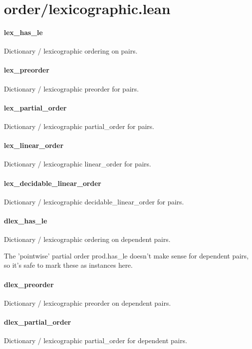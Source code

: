 \documentclass{article}
\begin{document}
\section{order/lexicographic.lean}\paragraph{lex\_has\_le}
\par
Dictionary / lexicographic ordering on pairs.
\paragraph{lex\_preorder}
\par
Dictionary / lexicographic preorder for pairs.
\paragraph{lex\_partial\_order}
\par
Dictionary / lexicographic partial\_order for pairs.
\paragraph{lex\_linear\_order}
\par
Dictionary / lexicographic linear\_order for pairs.
\paragraph{lex\_decidable\_linear\_order}
\par
Dictionary / lexicographic decidable\_linear\_order for pairs.
\paragraph{dlex\_has\_le}
\par
Dictionary / lexicographic ordering on dependent pairs.
\par
The 'pointwise' partial order 
\colorbox[RGB]{253,246,227}{{{{\color[RGB]{101, 123, 131} prod.has\_le }}}} doesn't make
sense for dependent pairs, so it's safe to mark these as
instances here.
\paragraph{dlex\_preorder}
\par
Dictionary / lexicographic preorder on dependent pairs.
\paragraph{dlex\_partial\_order}
\par
Dictionary / lexicographic partial\_order for dependent pairs.
\end{document}
